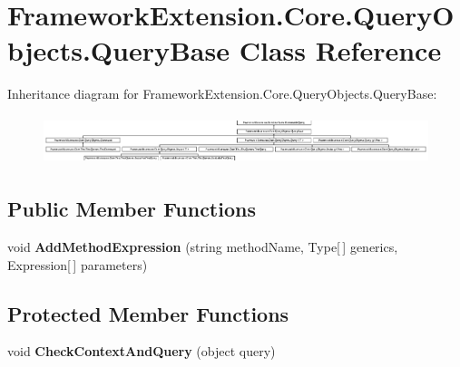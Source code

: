 \hypertarget{class_framework_extension_1_1_core_1_1_query_objects_1_1_query_base}{\section{Framework\-Extension.\-Core.\-Query\-Objects.\-Query\-Base Class Reference}
\label{class_framework_extension_1_1_core_1_1_query_objects_1_1_query_base}
}
Inheritance diagram for Framework\-Extension.\-Core.\-Query\-Objects.\-Query\-Base\-:\begin{figure}[H]
\begin{center}
\leavevmode
\includegraphics[height=1.435897cm]{class_framework_extension_1_1_core_1_1_query_objects_1_1_query_base}
\end{center}
\end{figure}
\subsection*{Public Member Functions}
\begin{DoxyCompactItemize}
\item 
\hypertarget{class_framework_extension_1_1_core_1_1_query_objects_1_1_query_base_ae3aea1df91af19d2d7a66d6fe4ec8298}{void {\bfseries Add\-Method\-Expression} (string method\-Name, Type\mbox{[}$\,$\mbox{]} generics, Expression\mbox{[}$\,$\mbox{]} parameters)}\label{class_framework_extension_1_1_core_1_1_query_objects_1_1_query_base_ae3aea1df91af19d2d7a66d6fe4ec8298}

\end{DoxyCompactItemize}
\subsection*{Protected Member Functions}
\begin{DoxyCompactItemize}
\item 
\hypertarget{class_framework_extension_1_1_core_1_1_query_objects_1_1_query_base_aaf9a0085a76601d6ee93ed18f4396661}{void {\bfseries Check\-Context\-And\-Query} (object query)}\label{class_framework_extension_1_1_core_1_1_query_objects_1_1_query_base_aaf9a0085a76601d6ee93ed18f4396661}

\end{DoxyCompactItemize}
